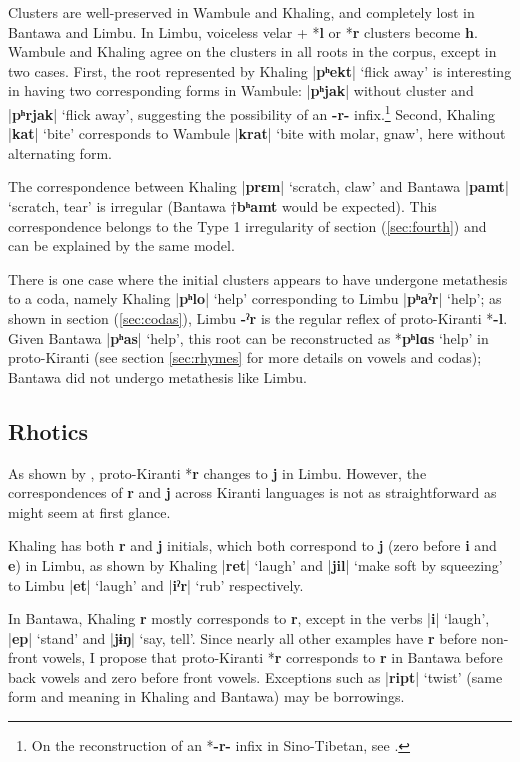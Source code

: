\documentclass[oldfontcommands,oneside,a4paper,11pt]{article}
\newcommand{\ipa}[1]{\textbf{{\phon\mbox{#1}}}} %
\newcommand{\dhatu}[2]{|\ipa{#1}| `#2'}
\begin{document}
Clusters are well-preserved in Wambule and Khaling, and completely lost in Bantawa and Limbu. In Limbu, voiceless velar + *\ipa{l} or *\ipa{r} clusters become \ipa{h}. Wambule and Khaling  agree on the clusters in all roots in the corpus, except in two cases. First, the root represented by Khaling \dhatu{pʰekt}{flick away} is interesting in having two corresponding forms in Wambule: |\ipa{pʰjak}| without cluster and \dhatu{pʰrjak}{flick away}, suggesting the possibility of an \ipa{-r-} infix.\footnote{On the reconstruction of an *\ipa{-r-} infix in Sino-Tibetan, see \citet[111-120]{sagart99roc}.} Second, Khaling \dhatu{kat}{bite} corresponds to Wambule  \dhatu{krat}{bite with molar, gnaw}, here without alternating form.

The correspondence between Khaling \dhatu{prɛm}{scratch, claw} and Bantawa  \dhatu{pamt}{scratch, tear} is irregular (Bantawa $\dagger$\ipa{bʰamt} would be expected). This correspondence belongs to the Type 1 irregularity of section (\ref{sec:fourth}) and can be explained by the same model.

There is one case where the initial clusters appears to have undergone metathesis to a coda, namely Khaling \dhatu{pʰlo}{help} corresponding to Limbu \dhatu{pʰaˀr}{help}; as shown in section (\ref{sec:codas}), Limbu \ipa{-ˀr} is the regular reflex of proto-Kiranti *\ipa{-l}. Given Bantawa \dhatu{pʰas}{help}, this root can be reconstructed as *\ipa{pʰlɑs} `help' in proto-Kiranti (see section \ref{sec:rhymes} for more details on vowels and codas); Bantawa did not undergo metathesis like Limbu.
 
\subsection{Rhotics} 
As shown by  \citet{driem90r}, proto-Kiranti *\ipa{r} changes to \ipa{j} in Limbu. However, the correspondences of \ipa{r} and \ipa{j} across Kiranti languages is not as straightforward as might seem at first glance.

Khaling has both \ipa{r} and \ipa{j} initials, which both correspond to \ipa{j} (zero before \ipa{i} and \ipa{e}) in Limbu, as shown by Khaling \dhatu{ret}{laugh} and  \dhatu{jil}{make soft by squeezing} to Limbu \dhatu{et}{laugh} and \dhatu{iˀr}{rub} respectively.

In Bantawa, Khaling \ipa{r} mostly corresponds to \ipa{r}, except in the verbs \dhatu{i}{laugh}, \dhatu{ep}{stand} and \dhatu{jɨŋ}{say, tell}. Since nearly all other examples have \ipa{r} before non-front vowels, I propose that proto-Kiranti *\ipa{r} corresponds to \ipa{r} in Bantawa before back vowels and zero before front vowels. Exceptions such as \dhatu{ript}{twist} (same form and meaning in Khaling and Bantawa) may be borrowings.
\end{document}
